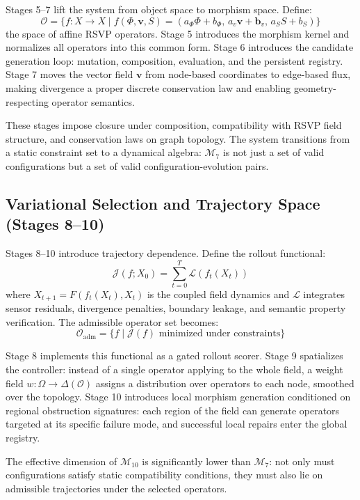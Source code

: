 \documentclass[11pt, oneside]{article}
\begin{document}
Stages 5--7 lift the system from object space to morphism space. Define:
\[
\mathcal{O} = \{ f : X \to X \mid f(\Phi, \mathbf{v}, S) = (a_\Phi\Phi + b_\Phi,\, a_v\mathbf{v} + \mathbf{b}_v,\, a_S S + b_S) \}
\]
the space of affine RSVP operators. Stage 5 introduces the morphism kernel and
normalizes all operators into this common form. Stage 6 introduces the candidate
generation loop: mutation, composition, evaluation, and the persistent registry.
Stage 7 moves the vector field $\mathbf{v}$ from node-based coordinates to edge-based
flux, making divergence a proper discrete conservation law and enabling
geometry-respecting operator semantics.

These stages impose closure under composition, compatibility with RSVP field structure,
and conservation laws on graph topology. The system transitions from a static constraint
set to a dynamical algebra: $\mathcal{M}_7$ is not just a set of valid configurations
but a set of valid configuration-evolution pairs.

\subsection{Variational Selection and Trajectory Space (Stages 8--10)}

Stages 8--10 introduce trajectory dependence. Define the rollout functional:
\[
\mathcal{J}(f; X_0) = \sum_{t=0}^T \mathcal{L}(f_t(X_t))
\]
where $X_{t+1} = F(f_t(X_t), X_t)$ is the coupled field dynamics and $\mathcal{L}$
integrates sensor residuals, divergence penalties, boundary leakage, and semantic
property verification. The admissible operator set becomes:
\[
\mathcal{O}_{\mathrm{adm}} = \{ f \mid \mathcal{J}(f) \text{ minimized under constraints} \}
\]

Stage 8 implements this functional as a gated rollout scorer. Stage 9 spatializes the
controller: instead of a single operator applying to the whole field, a weight field
$w : \Omega \to \Delta(\mathcal{O})$ assigns a distribution over operators to each node,
smoothed over the topology. Stage 10 introduces local morphism generation conditioned on
regional obstruction signatures: each region of the field can generate operators targeted
at its specific failure mode, and successful local repairs enter the global registry.

The effective dimension of $\mathcal{M}_{10}$ is significantly lower than
$\mathcal{M}_7$: not only must configurations satisfy static compatibility conditions,
they must also lie on admissible trajectories under the selected operators.
\end{document}
